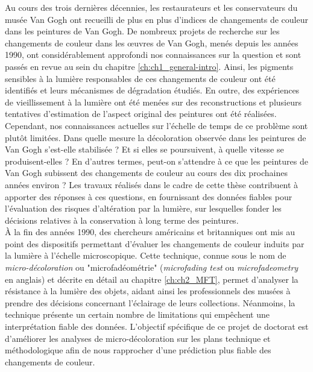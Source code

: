 Au cours des trois dernières décennies, les restaurateurs et les conservateurs du musée Van Gogh ont recueilli de plus en plus d'indices de changements de couleur dans les peintures de Van Gogh. De nombreux projets de recherche sur les changements de couleur dans les œuvres de Van Gogh, menés depuis les années 1990, ont considérablement approfondi nos connaissances sur la question et sont passés en revue au sein du chapitre \ref{ch:ch1_general-intro}. Ainsi, les pigments sensibles à la lumière responsables de ces changements de couleur ont été identifiés et leurs mécanismes de dégradation étudiés. En outre, des expériences de vieillissement à la lumière ont été menées sur des reconstructions et plusieurs tentatives d'estimation de l'aspect original des peintures ont été réalisées. Cependant, nos connaissances actuelles sur l'échelle de temps de ce problème sont plutôt limitées. Dans quelle mesure la décoloration observée dans les peintures de Van Gogh s'est-elle stabilisée ? Et si elles se poursuivent, à quelle vitesse se produisent-elles ? En d'autres termes, peut-on s'attendre à ce que les peintures de Van Gogh subissent des changements de couleur au cours des dix prochaines années environ ? Les travaux réalisés dans le cadre de cette thèse contribuent à apporter des réponses à ces questions, en fournissant des données fiables pour l'évaluation des risques d'altération par la lumière, sur lesquelles fonder les décisions relatives à la conservation à long terme des peintures. \\

À la fin des années 1990, des chercheurs américains et britanniques ont mis au point des dispositifs permettant d'évaluer les changements de couleur induits par la lumière à l'échelle microscopique. Cette technique, connue sous le nom de \textit{micro-décoloration} ou "microfadéométrie" (\textit{microfading test} ou \textit{microfadeometry} en anglais) et décrite en détail au chapitre \ref{ch:ch2_MFT}, permet d'analyser la résistance à la lumière des objets, aidant ainsi les professionnels des musées à prendre des décisions concernant l'éclairage de leurs collections. Néanmoins, la technique présente un certain nombre de limitations qui empêchent une interprétation fiable des données. L'objectif spécifique de ce projet de doctorat est d'améliorer les analyses de micro-décoloration sur les plans technique et méthodologique afin de nous rapprocher d'une prédiction plus fiable des changements de couleur. \\

